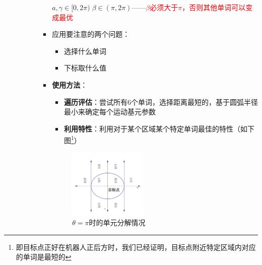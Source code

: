 \documentclass[../main.tex]{subfiles}
\begin{document}
\begin{enumerate}
\begin{itemize}
\begin{enumerate}
\begin{itemize}
                            \( a,\gamma  \in  \lbrack 0,{2\pi })\;\beta  \in  \left( {\pi ,{2\pi }}\right) \)——\textcolor{red}{$\beta$必须大于$\pi$，否则其他单词可以变成最优}
                            \item{应用要注意的两个问题}：
                                \begin{itemize}
                                    \item 选择什么单词
                                    \item 下标取什么值
                                \end{itemize}
                            \item \textbf{使用方法}：
                                \begin{itemize}
                                    \item \textbf{遍历评估}：尝试所有6个单词，选择距离最短的，基于圆弧半径最小来确定每个运动基元参数
                                    \item \textbf{利用特性}：利用对于某个区域某个特定单词最佳的特性（如下图\footnote{即目标点正好在机器人正后方时，我们已经证明，目标点附近特定区域内对应的单词是最短的}）
                                \end{itemize}
                            \begin{figure}[H]
                                \centering
                                \includegraphics[width=0.43\textwidth]{images/DUBINSpi.png}
                                \caption{$\theta=\pi$时的单元分解情况}
                            \end{figure} 
                        \end{itemize}



\end{enumerate}
\end{itemize}
\end{enumerate}
\end{document}

